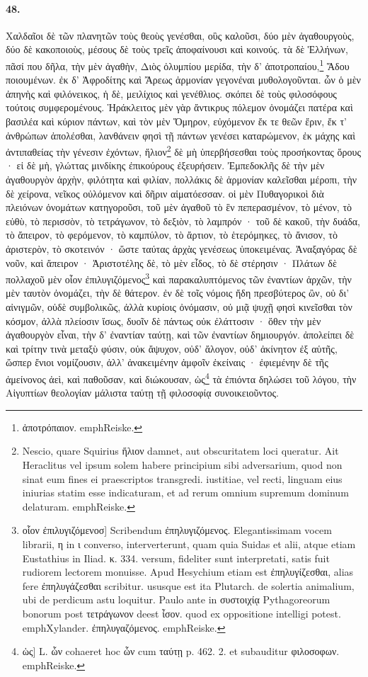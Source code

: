 \documentclass[a4paper, 11pt, oneside, polutonikogreek, german]{article}
\begin{document}
\paragraph{48.}
Χαλδαῖοι δὲ τῶν πλανητῶν τοὺς θεοὺς γενέσθαι, οὓς καλοῦσι, δύο μὲν ἀγαθουργοὺς, δύο δὲ κακοποιοὺς, μέσους δὲ τοὺς τρεῖς ἀποφαίνουσι καὶ κοινούς. τὰ δὲ Ἑλλήνων, πᾶσί που δῆλα, τὴν μὲν ἀγαθὴν, Διὸς ὀλυμπίου μερίδα, τὴν δ' ἀποτροπαίου,\footnote{ἀποτρόπαιον. emph{Reiske.}} Ἅδου ποιουμένων. ἐκ δ' Ἀφροδίτης καὶ Ἄρεως ἁρμονίαν γεγονέναι μυθολογοῦνται. ὧν ὁ μὲν ἀπηνὴς καὶ φιλόνεικος, ἡ δὲ, μειλίχιος καὶ γενέθλιος. σκόπει δὲ τοὺς φιλοσόφους τούτοις συμφερομένους. Ἡράκλειτος μὲν γὰρ ἄντικρυς πόλεμον ὀνομάζει πατέρα καὶ βασιλέα καὶ κύριον πάντων, καὶ τὸν μὲν Ὅμηρον, εὐχόμενον ἔκ τε θεῶν ἔριν, ἔκ τ' ἀνθρώπων ἀπολέσθαι, λανθάνειν φησὶ τῇ πάντων γενέσει καταρώμενον, ἐκ μάχης καὶ ἀντιπαθείας τὴν γένεσιν ἐχόντων, ἥλιον\footnote{Nescio, quare Squirius ἥλιον damnet, aut obscuritatem loci queratur. Ait Heraclitus vel ipsum solem habere principium sibi adversarium, quod non sinat eum fines ei praescriptos transgredi. iustitiae, vel recti, linguam eius iniurias statim esse indicaturam, et ad rerum omnium supremum dominum delaturam. emph{Reiske.}} δὲ μὴ ὑπερβήσεσθαι τοὺς προσήκοντας ὅρους · εἰ δὲ μὴ, γλώττας μινδίκης ἐπικούρους ἐξευρήσειν. Ἐμπεδοκλῆς δὲ τὴν μὲν ἀγαθουργὸν ἀρχὴν, φιλότητα καὶ φιλίαν, πολλάκις δὲ ἁρμονίαν καλεῖσθαι μέροπι, τὴν δὲ χείρονα, νεῖκος οὐλόμενον καὶ δῆριν αἱματόεσσαν. οἱ μὲν Πυθαγορικοὶ διὰ πλειόνων ὀνομάτων κατηγοροῦσι, τοῦ μὲν ἀγαθοῦ τὸ ἓν πεπερασμένον, τὸ μένον, τὸ εὐθὺ, τὸ περισσὸν, τὸ τετράγωνον, τὸ δεξιὸν, τὸ λαμπρόν · τοῦ δὲ κακοῦ, τὴν δυάδα, τὸ ἄπειρον, τὸ φερόμενον, τὸ καμπύλον, τὸ ἄρτιον, τὸ ἑτερόμηκες, τὸ ἄνισον, τὸ ἀριστερὸν, τὸ σκοτεινόν · ὥστε ταύτας ἀρχὰς γενέσεως ὑποκειμένας. Ἀναξαγόρας δὲ νοῦν, καὶ ἄπειρον · Ἀριστοτέλης δὲ, τὸ μὲν εἶδος, τὸ δὲ στέρησιν · Πλάτων δὲ πολλαχοῦ μὲν οἷον ἐπιλυγιζόμενος\footnote{οἷον ἐπιλυγιζόμενοσ] Scribendum ἐπηλυγιζόμενος. Elegantissimam vocem librarii, η in ι converso, interverterunt, quam quia Suidas et alii, atque etiam Eustathius in Iliad. κ. 334. versum, fideliter sunt interpretati, satis fuit rudiorem lectorem monuisse. Apud Hesychium etiam est ἐπηλυγίζεσθαι, alias fere ἐπηλυγάζεσθαι scribitur. ususque est ita Plutarch. de solertia animalium, ubi de perdicum astu loquitur. Paulo ante in συστοιχίᾳ Pythagoreorum bonorum post τετράγωνον deest ἶσον. quod ex oppositione intelligi potest. emph{Xylander.} ἐπηλυγαζόμενος. emph{Reiske.}} καὶ παρακαλυπτόμενος τῶν ἐναντίων ἀρχῶν, τὴν μὲν ταυτὸν ὀνομάζει, τὴν δὲ θάτερον. ἐν δὲ τοῖς νόμοις ἤδη πρεσβύτερος ὢν, οὐ δι' αἰνιγμῶν, οὐδὲ συμβολικῶς, ἀλλὰ κυρίοις ὀνόμασιν, οὐ μιᾷ ψυχῇ φησὶ κινεῖσθαι τὸν κόσμον, ἀλλὰ πλείοσιν ἴσως, δυοῖν δὲ πάντως οὐκ ἐλάττοσιν · ὅθεν τὴν μὲν ἀγαθουργὸν εἶναι, τὴν δ' ἐναντίαν ταύτῃ, καὶ τῶν ἐναντίων δημιουργόν. ἀπολείπει δὲ καὶ τρίτην τινὰ μεταξὺ φύσιν, οὐκ ἄψυχον, οὐδ' ἄλογον, οὐδ' ἀκίνητον ἐξ αὑτῆς, ὥσπερ ἔνιοι νομίζουσιν, ἀλλ' ἀνακειμένην ἀμφοῖν ἐκείναις · ἐφιεμένην δὲ τῆς ἀμείνονος ἀεὶ, καὶ παθοῦσαν, καὶ διώκουσαν, ὡς\footnote{ὡς] L. ὧν cohaeret hoc ὧν cum ταύτῃ p. 462. 2. et subauditur φιλοσοφων. emph{Reiske.}} τὰ ἐπιόντα δηλώσει τοῦ λόγου, τὴν Αἰγυπτίων θεολογίαν μάλιστα ταύτῃ τῇ φιλοσοφίᾳ συνοικειοῦντος.
\end{document}
